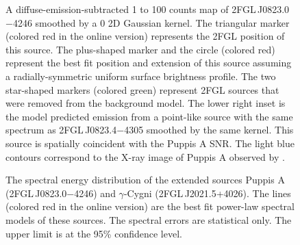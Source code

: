 \documentclass[12pt,preprint]{aastex}
\newif\ifcolorfigure
\newcommand{\gev}{\text{GeV}\xspace}
\newcommand{\rosat}{\text{{\em ROSAT}}\xspace}
\begin{document}
\begin{figure}
    \ifcolorfigure
      \plotone{source_plots/source_Puppis_A_color.eps}
    \else
    \fi
  \caption{A diffuse-emission-subtracted 1 \gev to 100 \gev counts map
  of 2FGL\,J0823.0$-$4246 smoothed by a 0 2D
  Gaussian kernel.  The triangular marker 
  (colored red in the online version)
  represents the 2FGL position of this source.  The plus-shaped
  marker and the circle (colored
  red) represent 
  the best fit position and extension of this source assuming a
  radially-symmetric uniform surface brightness profile.  The two 
  star-shaped markers (colored
  green) represent 2FGL sources that were
  removed from the background model.
  The lower right inset is the model predicted emission from a point-like
  source with the same spectrum as 2FGL\,J0823.4$-$4305 smoothed by the
  same kernel.  This source is spatially coincident with the Puppis A
  SNR. The light blue contours correspond to the X-ray image of Puppis
  A observed by \rosat \citep{rosat_puppis_a}.
  }\label{1FGL_J0823.3-4248}
\end{figure}

\clearpage
\begin{figure}
    \ifcolorfigure
      \plotone{summary_plots/snr_seds_color.eps}
    \else
    \fi
    \caption{
    The spectral energy distribution of the extended sources 
    Puppis A (2FGL\,J0823.0$-$4246) and $\gamma$-Cygni 
    (2FGL\,J2021.5+4026).
    The lines (colored red in the online version)
    are the best fit power-law spectral models of
    these sources.
    The spectral errors are statistical only.
    The upper limit is at the 95\% confidence level.
    }
    \label{snr_seds}
  \end{figure}
\end{document}
